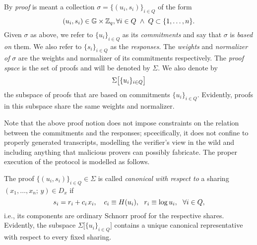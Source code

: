 \documentclass{iacrtrans}
\begin{document}
\begin{defn}\label{orst_proof_def}
By \textit{proof} is meant a collection
$\sigma = \{(u_i, s_i)\}_{i \in Q}$ of the form
\vspace{5pt}
\begin{equation*}\label{orst_proof_form}
(u_i, s_i) \in \mathbb{G} \times \mathbb{Z}_q,
\vspace{2pt}\forall i \in Q
\hspace{3pt}
\land
\hspace{3pt}
Q \subset \{1, \dots, n\}.
\vspace{5pt}
\end{equation*}
Given $\sigma$ as above, we refer to
$\{u_i\}_{i \in Q}$ as its \textit{commitments} and
say that $\sigma$ is \textit{based on} them.
We also refer to $\{s_i\}_{i \in Q}$ as the
\textit{responses}.
The \textit{weights} and \textit{normalizer of} $\sigma$
are the weights and normalizer of its commitments respectively.
The \textit{proof space}
is the set of proofs and will be denoted by $\Sigma$.
We also denote by
\vspace{5pt}
\begin{equation*}\label{orst_proofs_on_commitments}
\Sigma\big[\{u_i\}_{i \in Q}\big]
\vspace{5pt}
\end{equation*}
the subspace of proofs that are
based on commitments $\{u_i\}_{i \in Q}$.
Evidently, proofs in this subspace
share the same weights and normalizer.
\end{defn}

\noindent
Note that the above proof notion does not impose
constraints on the relation between
the commitments and the responses;
spcecifically, it does not confine
to properly generated transcripts,
modelling the verifier's view in the wild
and including anything that malicious provers can possibly fabricate.
The proper execution of the protocol
is modelled as follows.

\begin{defn}\label{orst_canonical_def}
The proof $\{(u_i, s_i)\}_{i \in Q} \in \Sigma$ is called
\textit{canonical with respect to} a sharing
$(x_1, \dots, x_n;\hspace{2pt} y) \in D_x$ if
\vspace{5pt}
\begin{equation}\label{orst_canonical}
s_i = r_i + c_i \hspace{1pt} x_i,
\ \ \ c_i \equiv H(u_i),
\ \ r_i \equiv \log u_i,
\ \ \forall i \in Q,
\vspace{5pt}
\end{equation}
i.e., its components are ordinary Schnorr proof
for the respective shares.
Evidently, the subspace
$\Sigma\big[\{u_i\}_{i \in Q}\big]$
contains a unique canonical representative
with respect to every fixed sharing.
\end{defn}
\end{document}
